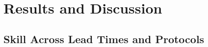 \section{Results and Discussion}
\label{sec:results}


\subsection{Skill Across Lead Times and Protocols}
\label{sec:res-skill}

